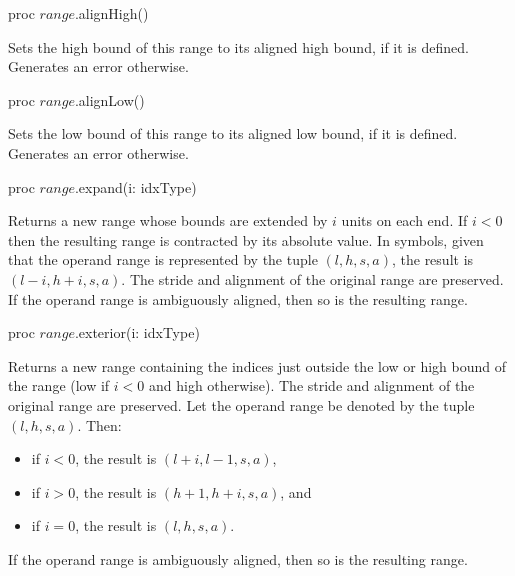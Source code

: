 \begin{protohead}
proc $range$.alignHigh()
\end{protohead}
\begin{protobody}
Sets the high bound of this range to its aligned high bound, if it is defined.
Generates an error otherwise.
\end{protobody}

\begin{protohead}
proc $range$.alignLow()
\end{protohead}
\begin{protobody}
Sets the low bound of this range to its aligned low bound, if it is defined.
Generates an error otherwise.
\end{protobody}

\begin{protohead}
proc $range$.expand(i: idxType)
\end{protohead}
\begin{protobody}
Returns a new range whose bounds are extended by $i$ units on each end.  If $i <
0$ then the resulting range is contracted by its absolute value.  In symbols,
given that the operand range is represented by the tuple $(l,h,s,a)$, the result
is $(l-i,h+i,s,a)$.  The stride and alignment of the original range are preserved.
If the operand range is ambiguously aligned, then so is the resulting range.
\end{protobody}

\begin{protohead}
proc $range$.exterior(i: idxType)
\end{protohead}
\begin{protobody}
Returns a new range containing the indices just outside the low or high bound of
the range (low if $i < 0$ and high otherwise).  The stride and alignment of the
original range are preserved.  Let the operand range
be denoted by the tuple $(l,h,s,a)$.  Then:
\begin{itemize}
\item[] if $i < 0$, the result is $(l+i,l-1,s,a)$,
\item[] if $i > 0$, the result is $(h+1,h+i,s,a)$, and
\item[] if $i = 0$, the result is $(l,h,s,a)$.
\end{itemize}
If the operand range is ambiguously aligned, then so is the resulting range.
\end{protobody}

